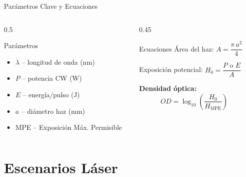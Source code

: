 \documentclass[aspectratio=169,12pt]{beamer}
\begin{document}
\begin{frame}{Parámetros Clave y Ecuaciones}
	\begin{columns}
		\begin{column}{0.5\textwidth}
			\begin{block}{Parámetros}
				\begin{itemize}
					\item $\lambda$ -- longitud de onda (nm)
					\item $P$ -- potencia CW (W)
					\item $E$ -- energía/pulso (J)
					\item $a$ -- diámetro haz (mm)
					\item MPE -- Exposición Máx. Permisible
				\end{itemize}
			\end{block}
		\end{column}
		\begin{column}{0.45\textwidth}
			\begin{block}{Ecuaciones}
				Área del haz:
				$A = \dfrac{\pi\,a^2}{4}$
				\vspace{0.2cm}

				Exposición potencial:
				$H_0 = \dfrac{P \text{ o } E}{A}$
				\vspace{0.2cm}

				\textbf{Densidad óptica:}
				\[\boxed{OD = \log_{10}\!\left(\frac{H_0}{H_{\mathrm{MPE}}}\right)}\]
			\end{block}
		\end{column}
	\end{columns}
\end{frame}

\section{Escenarios Láser}
\end{document}
